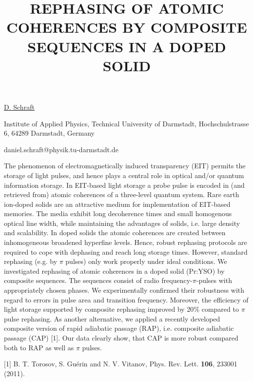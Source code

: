 \title{REPHASING OF ATOMIC COHERENCES BY COMPOSITE SEQUENCES IN A DOPED SOLID}

\underline{D. Schraft} 

{\normalsize{\vspace{-4mm}}
Institute of Applied Physics, Technical University of Darmstadt, Hochschulstrasse 6, 64289 Darmstadt, Germany

\email daniel.schraft@physik.tu-darmstadt.de}

The phenomenon of electromagnetically induced transparency (EIT) permits the storage of light pulses, and hence plays a central role in optical and/or quantum information storage. In EIT-based light storage a probe pulse is encoded in (and retrieved from) atomic coherences of a three-level quantum system.
Rare earth ion-doped solids are an attractive medium for implementation of EIT-based memories. The media exhibit long decoherence times and small homogenous optical line width, while maintaining the advantages of solids, i.e. large density and scalability. In doped solids the atomic coherences are created between inhomogeneous broadened hyperfine levels. Hence, robust rephasing protocols are required to cope with dephasing and reach long storage times. However, standard rephasing (e.g. by $\pi$ pulses) only work properly under ideal conditions.
We investigated rephasing of atomic coherences in a doped solid (Pr:YSO) by composite sequences. The sequences consist of radio frequency-$\pi$-pulses with appropriately chosen phases. We experimentally confirmed their robustness with regard to errors in pulse area and transition frequency. Moreover, the efficiency of light storage supported by composite rephasing improved by 20$\%$ compared to $\pi$ pulse rephasing. As another alternative, we applied a recently developed composite version of rapid adiabatic passage (RAP), i.e. composite adiabatic passage (CAP) [1].  Our data clearly show, that CAP is more robust compared both to RAP as well as $\pi$ pulses.

{\normalsize
[1] B. T. Torosov, S. Gu\'erin and N. V. Vitanov, Phys. Rev. Lett. \textbf{106}, 233001 (2011).
}

\vspace{\baselineskip}
